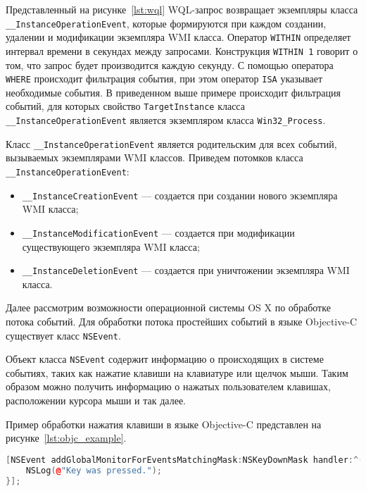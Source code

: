 Представленный на рисунке~\ref{lst:wql} WQL-запрос возвращает экземпляры класса
\texttt{\_\_InstanceOperationEvent}, которые формируются при каждом создании, удалении и
модификации экземпляра WMI класса. Оператор \texttt{WITHIN} определяет интервал времени
в секундах между запросами. Конструкция \texttt{WITHIN 1} говорит о том, что запрос будет
производится каждую секунду. С помощью оператора \texttt{WHERE} происходит фильтрация
события, при этом оператор \texttt{ISA} указывает необходимые события. В приведенном выше
примере происходит фильтрация событий, для которых свойство \texttt{TargetInstance} класса
\texttt{\_\_InstanceOperationEvent} является экземпляром класса \texttt{Win32\_Process}.

Класс \texttt{\_\_InstanceOperationEvent} является родительским для всех событий, вызываемых
экземплярами WMI классов. Приведем потомков класса \texttt{\_\_InstanceOperationEvent}:

\begin{itemize}
  \item \texttt{\_\_InstanceCreationEvent} --- создается при создании нового экземпляра
    WMI класса;
  \item \texttt{\_\_InstanceModificationEvent} --- создается при модификации существующего
    экземпляра WMI класса;
  \item \texttt{\_\_InstanceDeletionEvent} --- создается при уничтожении экземпляра WMI класса.
\end{itemize}

Далее рассмотрим возможности операционной системы OS X по обработке потока
событий. Для обработки потока простейших событий в языке Objective-C существует
класс \texttt{NSEvent}.

Объект класса \texttt{NSEvent} содержит информацию о происходящих в системе событиях,
таких как нажатие клавиши на клавиатуре или щелчок мыши. Таким образом можно
получить информацию о нажатых пользователем клавишах, расположении курсора мыши
и так далее.

Пример обработки нажатия клавиши в языке Objective-C представлен
на рисунке~\ref{lst:objc_example}.
\begin{lstlisting}[basicstyle=\scriptsize\ttfamily,
                   numberstyle=\scriptsize\ttfamily,
                   xleftmargin=7mm,
                   language=C++,caption=Пример обработки нажатия клавиши в Objective-C,
                   label=lst:objc_example]
[NSEvent addGlobalMonitorForEventsMatchingMask:NSKeyDownMask handler:^(NSEvent *event) {
    NSLog(@"Key was pressed.");
}];
\end{lstlisting}

